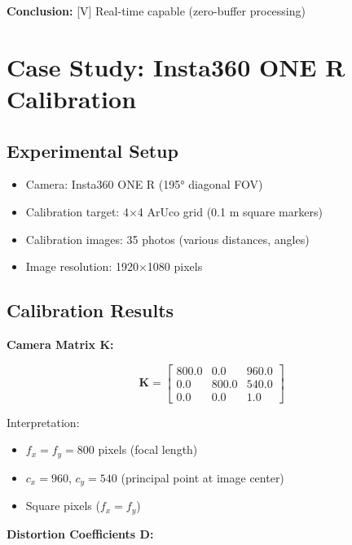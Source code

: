 \documentclass[11pt,a4paper,oneside]{article}
\begin{document}
\textbf{Conclusion:} [V] Real-time capable (zero-buffer processing)


\section{Case Study: Insta360 ONE R Calibration}
\label{sec:case}

\subsection{Experimental Setup}

\begin{itemize}
    \item Camera: Insta360 ONE R (195° diagonal FOV)
    \item Calibration target: 4×4 ArUco grid (0.1 m square markers)
    \item Calibration images: 35 photos (various distances, angles)
    \item Image resolution: 1920×1080 pixels
\end{itemize}

\subsection{Calibration Results}

\textbf{Camera Matrix K:}

\begin{equation}
\mathbf{K} = \begin{bmatrix}
800.0 & 0.0 & 960.0 \\
0.0 & 800.0 & 540.0 \\
0.0 & 0.0 & 1.0
\end{bmatrix}
\label{eq:insta360_K}
\end{equation}

Interpretation:
\begin{itemize}
    \item $f_x = f_y = 800$ pixels (focal length)
    \item $c_x = 960$, $c_y = 540$ (principal point at image center)
    \item Square pixels ($f_x = f_y$)
\end{itemize}

\textbf{Distortion Coefficients D:}
\end{document}
